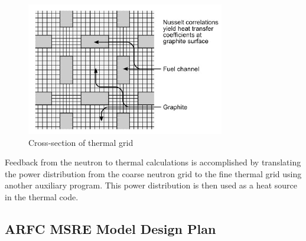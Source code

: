 \documentclass{article}
\let\Oldsubsection\subsection
\renewcommand{\subsection}{\FloatBarrier\Oldsubsection}
\begin{document}
\begin{figure}[htpb]
  \centering
  \includegraphics[max height=.5\textheight,max width=\textwidth,keepaspectratio]{cross-section-of-thermal-grid.png}
  \caption{Cross-section of thermal grid \cite{kophazi_development_????}}
  \label{fig:thermal-grid}
\end{figure}

Feedback from the neutron to thermal calculations is accomplished by translating
the power distribution from the coarse neutron grid to the fine thermal grid
using another auxiliary program. This power distribution is then used as a heat
source in the thermal code.

\subsection{ARFC \gls{MSRE} Model Design Plan}
\end{document}
